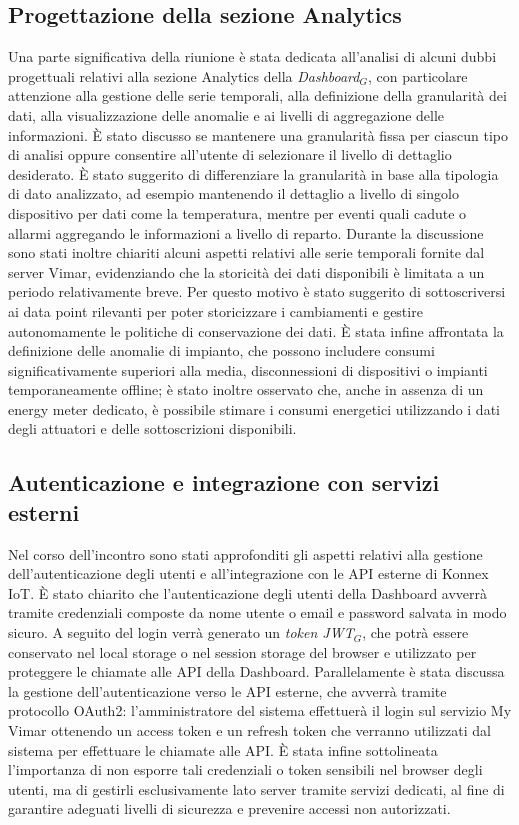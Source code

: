 \documentclass[10pt, letterpaper]{article}
\begin{document}
\subsection{Progettazione della sezione Analytics}
Una parte significativa della riunione è stata dedicata all’analisi di alcuni dubbi progettuali relativi alla sezione Analytics della \textit{Dashboard$_G$}, con particolare attenzione alla gestione delle serie temporali, alla definizione della granularità dei dati, alla visualizzazione delle anomalie e ai livelli di aggregazione delle informazioni.
\noindent
È stato discusso se mantenere una granularità fissa per ciascun tipo di analisi oppure consentire all’utente di selezionare il livello di dettaglio desiderato. È stato suggerito di differenziare la granularità in base alla tipologia di dato analizzato, ad esempio mantenendo il dettaglio a livello di singolo dispositivo per dati come la temperatura, mentre per eventi quali cadute o allarmi aggregando le informazioni a livello di reparto.
\noindent
Durante la discussione sono stati inoltre chiariti alcuni aspetti relativi alle serie temporali fornite dal server Vimar, evidenziando che la storicità dei dati disponibili è limitata a un periodo relativamente breve. Per questo motivo è stato suggerito di sottoscriversi ai data point rilevanti per poter storicizzare i cambiamenti e gestire autonomamente le politiche di conservazione dei dati.
\noindent
È stata infine affrontata la definizione delle anomalie di impianto, che possono includere consumi significativamente superiori alla media, disconnessioni di dispositivi o impianti temporaneamente offline; è stato inoltre osservato che, anche in assenza di un energy meter dedicato, è possibile stimare i consumi energetici utilizzando i dati degli attuatori e delle sottoscrizioni disponibili.


\subsection{Autenticazione e integrazione con servizi esterni}
Nel corso dell’incontro sono stati approfonditi gli aspetti relativi alla gestione dell’autenticazione degli utenti e all’integrazione con le API esterne di Konnex IoT.
\noindent
È stato chiarito che l’autenticazione degli utenti della Dashboard avverrà tramite credenziali composte da nome utente o email e password salvata in modo sicuro. A seguito del login verrà generato un \textit{token JWT$_G$}, che potrà essere conservato nel local storage o nel session storage del browser e utilizzato per proteggere le chiamate alle API della Dashboard.
\noindent
Parallelamente è stata discussa la gestione dell’autenticazione verso le API esterne, che avverrà tramite protocollo OAuth2: l’amministratore del sistema effettuerà il login sul servizio My Vimar ottenendo un access token e un refresh token che verranno utilizzati dal sistema per effettuare le chiamate alle API.
\noindent
È stata infine sottolineata l’importanza di non esporre tali credenziali o token sensibili nel browser degli utenti, ma di gestirli esclusivamente lato server tramite servizi dedicati, al fine di garantire adeguati livelli di sicurezza e prevenire accessi non autorizzati.
\end{document}
